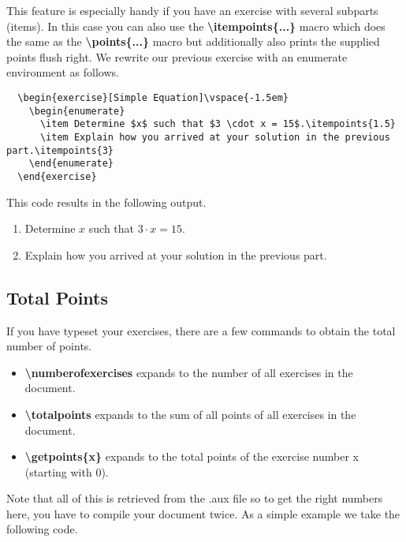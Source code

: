 \documentclass[
  twocolumn,%
  fontsize=9pt,%
  DIV=calc,%
  numbers=noendperiod%
]{scrartcl}
\begin{document}
This feature is especially handy if you have an exercise with several subparts (items). In this case you can also use the \textcolor{NavyBlue}{\ttfamily\bfseries \textbackslash itempoints\{...\}} macro which does the same as the \textcolor{NavyBlue}{\ttfamily\bfseries \textbackslash points\{...\}} macro but additionally also prints the supplied points flush right. We rewrite our previous exercise with an enumerate environment as follows.

\begin{lstlisting}
  \begin{exercise}[Simple Equation]\vspace{-1.5em}
    \begin{enumerate}
      \item Determine $x$ such that $3 \cdot x = 15$.\itempoints{1.5}
      \item Explain how you arrived at your solution in the previous part.\itempoints{3}
    \end{enumerate}
  \end{exercise} 
\end{lstlisting}

\noindent This code results in the following output.
\begin{exercise}\vspace{-1.5em}
  \begin{enumerate}
    \item Determine $x$ such that $3 \cdot x = 15$.
    \item Explain how you arrived at your solution in the previous part.
  \end{enumerate}
\end{exercise} 

\subsection{Total Points}
If you have typeset your exercises, there are a few commands to obtain the total number of points.

\begin{itemize}
  \item \textcolor{NavyBlue}{\ttfamily\bfseries\textbackslash numberofexercises} expands to the number of all exercises in the document.
  \item \textcolor{NavyBlue}{\ttfamily\bfseries\textbackslash totalpoints} expands to the sum of all points of all exercises in the document. 
  \item \textcolor{NavyBlue}{\ttfamily\bfseries\textbackslash getpoints\{x\}} expands to the total points of the exercise number x (starting with $0$). 
\end{itemize}
Note that all of this is retrieved from the .aux file so to get the right numbers here, you have to compile your document twice. As a simple example we take the following code.
\end{document}
